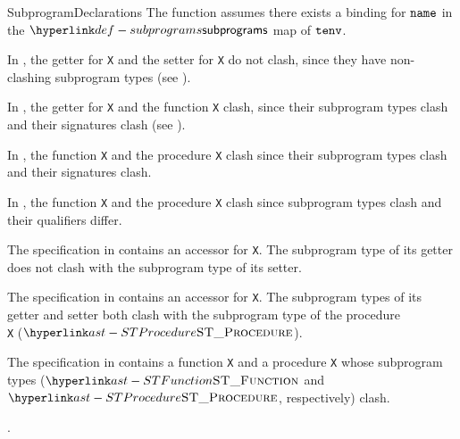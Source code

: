 \begin{TypingRuleList}{SubprogramDeclarations}
The function assumes there exists a binding for $\texttt{name}$ in the
$\subprograms$ map of $\texttt{tenv}$.

In , the getter for \verb|X| and the setter for \verb|X| do not clash,
since they have non-clashing subprogram types (see ).

In , the getter for \verb|X| and the function \verb|X| clash,
since their subprogram types clash and their signatures clash (see ).

In , the function \verb|X| and the procedure \verb|X| clash
since their subprogram types clash and their signatures clash.

In , the function \verb|X| and the procedure \verb|X| clash since subprogram types clash and their qualifiers differ.






The specification in  contains an accessor for \verb|X|.
The subprogram type of its getter does not clash with the subprogram type of its setter.

The specification in  contains an accessor for \verb|X|.
The subprogram types of its getter and setter both clash with the subprogram type of the procedure\\ \verb|X| ($\STProcedure$).

The specification in  contains a function \verb|X| and a procedure \verb|X|
whose subprogram types ($\STFunction$ and $\STProcedure$, respectively) clash.

\ProseParagraph
{}.


\end{TypingRuleList}
